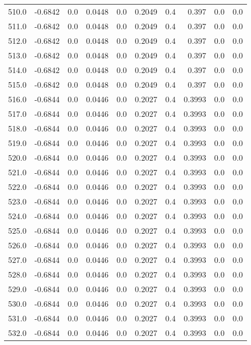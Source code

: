 \begin{longtable}{lrrrrrrrrr}
510.0 & -0.6842 & 0.0 & 0.0448 & 0.0 & 0.2049 & 0.4 & 0.397 & 0.0 & 0.0 \\
511.0 & -0.6842 & 0.0 & 0.0448 & 0.0 & 0.2049 & 0.4 & 0.397 & 0.0 & 0.0 \\
512.0 & -0.6842 & 0.0 & 0.0448 & 0.0 & 0.2049 & 0.4 & 0.397 & 0.0 & 0.0 \\
513.0 & -0.6842 & 0.0 & 0.0448 & 0.0 & 0.2049 & 0.4 & 0.397 & 0.0 & 0.0 \\
514.0 & -0.6842 & 0.0 & 0.0448 & 0.0 & 0.2049 & 0.4 & 0.397 & 0.0 & 0.0 \\
515.0 & -0.6842 & 0.0 & 0.0448 & 0.0 & 0.2049 & 0.4 & 0.397 & 0.0 & 0.0 \\
516.0 & -0.6844 & 0.0 & 0.0446 & 0.0 & 0.2027 & 0.4 & 0.3993 & 0.0 & 0.0 \\
517.0 & -0.6844 & 0.0 & 0.0446 & 0.0 & 0.2027 & 0.4 & 0.3993 & 0.0 & 0.0 \\
518.0 & -0.6844 & 0.0 & 0.0446 & 0.0 & 0.2027 & 0.4 & 0.3993 & 0.0 & 0.0 \\
519.0 & -0.6844 & 0.0 & 0.0446 & 0.0 & 0.2027 & 0.4 & 0.3993 & 0.0 & 0.0 \\
520.0 & -0.6844 & 0.0 & 0.0446 & 0.0 & 0.2027 & 0.4 & 0.3993 & 0.0 & 0.0 \\
521.0 & -0.6844 & 0.0 & 0.0446 & 0.0 & 0.2027 & 0.4 & 0.3993 & 0.0 & 0.0 \\
522.0 & -0.6844 & 0.0 & 0.0446 & 0.0 & 0.2027 & 0.4 & 0.3993 & 0.0 & 0.0 \\
523.0 & -0.6844 & 0.0 & 0.0446 & 0.0 & 0.2027 & 0.4 & 0.3993 & 0.0 & 0.0 \\
524.0 & -0.6844 & 0.0 & 0.0446 & 0.0 & 0.2027 & 0.4 & 0.3993 & 0.0 & 0.0 \\
525.0 & -0.6844 & 0.0 & 0.0446 & 0.0 & 0.2027 & 0.4 & 0.3993 & 0.0 & 0.0 \\
526.0 & -0.6844 & 0.0 & 0.0446 & 0.0 & 0.2027 & 0.4 & 0.3993 & 0.0 & 0.0 \\
527.0 & -0.6844 & 0.0 & 0.0446 & 0.0 & 0.2027 & 0.4 & 0.3993 & 0.0 & 0.0 \\
528.0 & -0.6844 & 0.0 & 0.0446 & 0.0 & 0.2027 & 0.4 & 0.3993 & 0.0 & 0.0 \\
529.0 & -0.6844 & 0.0 & 0.0446 & 0.0 & 0.2027 & 0.4 & 0.3993 & 0.0 & 0.0 \\
530.0 & -0.6844 & 0.0 & 0.0446 & 0.0 & 0.2027 & 0.4 & 0.3993 & 0.0 & 0.0 \\
531.0 & -0.6844 & 0.0 & 0.0446 & 0.0 & 0.2027 & 0.4 & 0.3993 & 0.0 & 0.0 \\
532.0 & -0.6844 & 0.0 & 0.0446 & 0.0 & 0.2027 & 0.4 & 0.3993 & 0.0 & 0.0 \\

\end{longtable}
